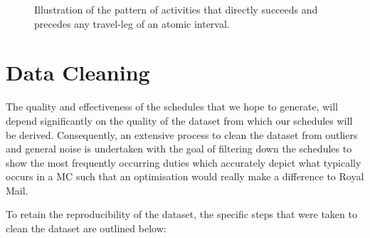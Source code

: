 
\begin{figure}{
\centering
           
    \caption{Illustration of the pattern of activities that directly succeeds and precedes any travel-leg of an atomic interval.}
    \label{fig:load/unload}
    }\end{figure}


\section{Data Cleaning}
\label{section: Data Cleaning}
The quality and effectiveness of the schedules that we hope to generate, will depend significantly on the quality of the dataset from which our schedules will be derived. Consequently, an extensive process to clean the dataset from outliers and general noise is undertaken with the goal of filtering down the schedules to show the most frequently occurring duties which accurately depict what typically occurs in a MC such that an optimisation would really make a difference to Royal Mail.\par

\vspace{\baselineskip}
\noindent
To retain the reproducibility of the dataset, the specific steps that were taken to clean the dataset are outlined below:


